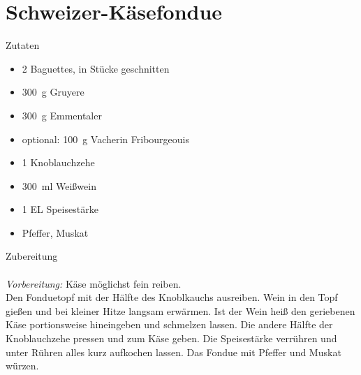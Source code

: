 \section*{Schweizer-Käsefondue}
\ihead{}\ohead{}
\cfoot{}
{\Large Zutaten}
\begin{multicols}{2}
\begin{itemize}
    \item \num{2} Baguettes, in Stücke geschnitten
    \item \SI{300}{g} Gruyere
    \item \SI{300}{g} Emmentaler
    \item optional: \SI{100}{g} Vacherin Fribourgeouis
    \item \num{1} Knoblauchzehe
    \item \SI{300}{ml} Weißwein
    \item \num{1} EL Speisestärke
    \item Pfeffer, Muskat
\end{itemize}
\end{multicols}
\noindent
{\Large Zubereitung}\\
\\
\textit{Vorbereitung:} Käse möglichst fein reiben.\\
Den Fonduetopf mit der Hälfte des Knoblkauchs ausreiben. 
Wein in den Topf gießen und bei kleiner Hitze langsam erwärmen. 
Ist der Wein heiß den geriebenen Käse portionsweise hineingeben und schmelzen lassen.
Die andere Hälfte der Knoblauchzehe pressen und zum Käse geben. 
Die Speisestärke verrühren und unter Rühren alles kurz aufkochen lassen.
Das Fondue mit Pfeffer und Muskat würzen.